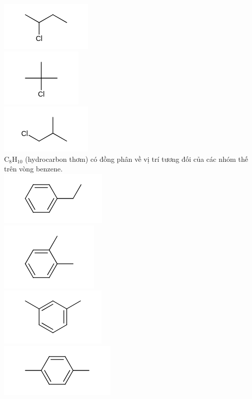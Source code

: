 \documentclass[10pt]{article}
\begin{document}
\includegraphics{smile-2ec7ac6dfb6e62c0b03300233410ccf59d7e1556}\\
\includegraphics{smile-ec4a74aaf271388cffb4d7f8b6e6f4c4e087294c}\\
\includegraphics{smile-1b584556796801f1626d1acbe0676d9eb09fbff7}\\
$\mathrm{C}_{8} \mathrm{H}_{10}$ (hydrocarbon thơm) có đồng phân về vị trí tương đối của các nhóm thế trên vòng benzene.\\
\includegraphics{smile-123878df13b8c2072625659d1b6e1325791b2812}\\
\includegraphics{smile-8fe4f93d6fbd7a20f3cb0893f5be7876b3a23e79}\\
\includegraphics{smile-ab9cc2604bb68fce806bfa076053e5f7e9c2476d}\\
\includegraphics{smile-3c58c693532a408942972be111f496131deb08ab}
\end{document}
